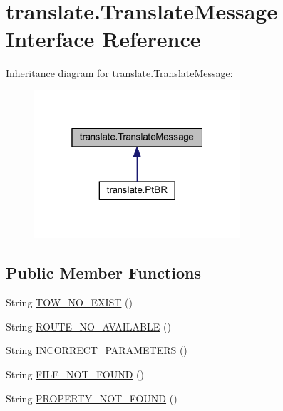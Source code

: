 \hypertarget{interfacetranslate_1_1_translate_message}{}\section{translate.\+Translate\+Message Interface Reference}
\label{interfacetranslate_1_1_translate_message}


Inheritance diagram for translate.\+Translate\+Message\+:\nopagebreak
\begin{figure}[H]
\begin{center}
\leavevmode
\includegraphics[width=217pt]{interfacetranslate_1_1_translate_message__inherit__graph}
\end{center}
\end{figure}
\subsection*{Public Member Functions}
\begin{DoxyCompactItemize}
\item 
String \hyperlink{interfacetranslate_1_1_translate_message_a14980a980a4b83cdb91d03ffc38ee0a9}{T\+O\+W\+\_\+\+N\+O\+\_\+\+E\+X\+I\+ST} ()
\item 
String \hyperlink{interfacetranslate_1_1_translate_message_a0344fddc67cf717c9129ef5677d0c0aa}{R\+O\+U\+T\+E\+\_\+\+N\+O\+\_\+\+A\+V\+A\+I\+L\+A\+B\+LE} ()
\item 
String \hyperlink{interfacetranslate_1_1_translate_message_ac31959ba666c507f8a95e889e8270461}{I\+N\+C\+O\+R\+R\+E\+C\+T\+\_\+\+P\+A\+R\+A\+M\+E\+T\+E\+RS} ()
\item 
String \hyperlink{interfacetranslate_1_1_translate_message_a3f2a7a799ec42cc41a55dee943fd4b2a}{F\+I\+L\+E\+\_\+\+N\+O\+T\+\_\+\+F\+O\+U\+ND} ()
\item 
String \hyperlink{interfacetranslate_1_1_translate_message_a08a2eabc6729bdd4a63f98aa1cc418e3}{P\+R\+O\+P\+E\+R\+T\+Y\+\_\+\+N\+O\+T\+\_\+\+F\+O\+U\+ND} ()
\end{DoxyCompactItemize}


